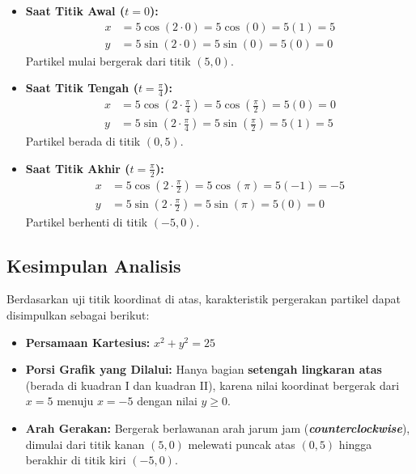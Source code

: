 \documentclass[12pt,a4paper]{article}
\begin{document}
\begin{itemize}
  \item \textbf{Saat Titik Awal ($t = 0$):}
    \begin{align*}
      x &= 5\cos(2 \cdot 0) = 5\cos(0) = 5(1) = 5 \\
      y &= 5\sin(2 \cdot 0) = 5\sin(0) = 5(0) = 0
    \end{align*}
    Partikel mulai bergerak dari titik \textbf{$(5, 0)$}.

  \item \textbf{Saat Titik Tengah ($t = \frac{\pi}{4}$):}
    \begin{align*}
      x &= 5\cos\left(2 \cdot \frac{\pi}{4}\right) = 5\cos\left(\frac{\pi}{2}\right) = 5(0) = 0 \\
      y &= 5\sin\left(2 \cdot \frac{\pi}{4}\right) = 5\sin\left(\frac{\pi}{2}\right) = 5(1) = 5
    \end{align*}
    Partikel berada di titik \textbf{$(0, 5)$}.

  \item \textbf{Saat Titik Akhir ($t = \frac{\pi}{2}$):}
    \begin{align*}
      x &= 5\cos\left(2 \cdot \frac{\pi}{2}\right) = 5\cos(\pi) = 5(-1) = -5 \\
      y &= 5\sin\left(2 \cdot \frac{\pi}{2}\right) = 5\sin(\pi) = 5(0) = 0
    \end{align*}
    Partikel berhenti di titik \textbf{$(-5, 0)$}.
\end{itemize}

\subsection*{Kesimpulan Analisis}
Berdasarkan uji titik koordinat di atas, karakteristik pergerakan partikel dapat disimpulkan sebagai berikut:
\begin{itemize}
  \item \textbf{Persamaan Kartesius:} $x^2 + y^2 = 25$
  \item \textbf{Porsi Grafik yang Dilalui:} Hanya bagian \textbf{setengah lingkaran atas} (berada di kuadran I dan kuadran II), karena nilai koordinat bergerak dari $x = 5$ menuju $x = -5$ dengan nilai $y \ge 0$.
  \item \textbf{Arah Gerakan:} Bergerak berlawanan arah jarum jam (\textbf{\textit{counterclockwise}}), dimulai dari titik kanan $(5,0)$ melewati puncak atas $(0,5)$ hingga berakhir di titik kiri $(-5,0)$.
\end{itemize}
\end{document}
